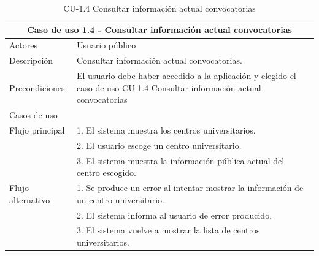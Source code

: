 \begin{table}[H]
\caption{CU-1.4 Consultar información actual convocatorias}  \label{tab:CU-1.4}
        \begin{center}
            \begin{tabular}{|l|p{12cm}|}
                \hline
                \multicolumn{2}{|c|}{Caso de uso 1.4 - Consultar información actual convocatorias} \\ \hline \hline
                Actores           &   Usuario público          \\  \hline
                Descripción         &   Consultar información actual convocatorias. \\  \hline
                Precondiciones          &   El usuario debe haber accedido a la aplicación y elegido el caso de uso CU-1.4 Consultar información actual convocatorias  \\  \hline
                Casos de uso            &          \\  \hline
                Flujo principal         &   1. El sistema muestra los centros universitarios.   \\
                &   2. El usuario escoge un centro universitario.    \\                  & 3. El sistema muestra la información pública actual del centro escogido. \\ \hline
                 Flujo alternativo    &   1. Se produce un error al intentar mostrar la información de un  centro  universitario. 
                \\  & 2. El sistema informa al usuario de error producido. 
                \\  & 3. El sistema vuelve a mostrar la lista de centros  universitarios. 
                \\
                \hline
            \end{tabular}
        \end{center}
    \end{table}

